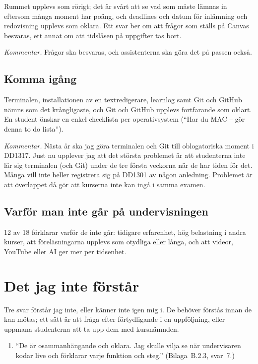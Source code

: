 \documentclass[a4paper]{article}
\begin{document}
\begin{refsection}
Rummet upplevs som rörigt; det är svårt att se vad som måste lämnas in
eftersom många moment har poäng, och deadlines och datum för inlämning
och redovisning upplevs som oklara. Ett svar ber om att frågor som ställs
på Canvas besvaras, ett annat om att tidslåsen på uppgifter tas bort.

\emph{Kommentar.} Frågor ska besvaras, och assistenterna ska göra det på
passen också.

\subsection{Komma igång}

Terminalen, installationen av en textredigerare, learnlog samt Git och
GitHub nämns som det krångligaste, och Git och GitHub upplevs fortfarande
som oklart. En student önskar en enkel checklista per operativsystem
(\enquote{Har du MAC -- gör denna to do lista}).

\emph{Kommentar.} Nästa år ska jag göra terminalen och Git till oblogatoriska 
moment i DD1317.
Just nu upplever jag att det största problemet är att studenterna inte lär sig 
terminalen (och Git) under de tre första veckorna när de har tiden för det.
Många vill inte heller registrera sig på DD1301 av någon anledning.
Problemet är att överlappet då gör att kurserna inte kan ingå i samma examen.

\subsection{Varför man inte går på undervisningen}

12 av 18 förklarar varför de inte går: tidigare erfarenhet, hög belastning
i andra kurser, att föreläsningarna upplevs som otydliga eller långa, och
att videor, YouTube eller AI ger mer per tidsenhet.

\section{Det jag inte förstår}\label{sec:forstar-inte}

Tre svar förstår jag inte, eller känner inte igen mig i. De behöver
förstås innan de kan mötas; ett sätt är att fråga efter förtydligande i en
uppföljning, eller uppmana studenterna att ta upp dem med kursnämnden.

\begin{enumerate}
\item \enquote{De är osammanhängande och oklara. Jag skulle vilja se när
  undervisaren kodar live och förklarar varje funktion och steg.}
  (Bilaga~B.2.3, svar~7.)


\end{enumerate}
\end{refsection}
\end{document}
